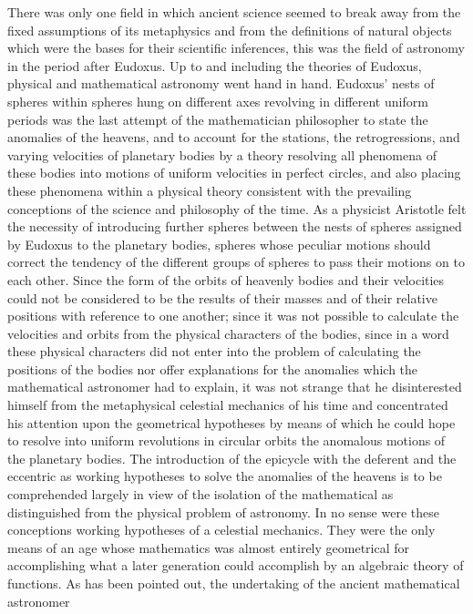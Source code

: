 \documentclass[12pt]{article}
\begin{document}
There was only one field in which ancient science
seemed to break away from the fixed assumptions
of its metaphysics and from the definitions of natural
objects which were the bases for their scientific inferences,
this was the field of astronomy in the period
after Eudoxus. Up to and including the theories of
Eudoxus, physical and mathematical astronomy went
hand in hand. Eudoxus' nests of spheres within spheres
hung on different axes revolving in different uniform
periods was the last attempt of the mathematician
philosopher to state the anomalies of the heavens, and
to account for the stations, the retrogressions, and
varying velocities of planetary bodies by a theory resolving
all phenomena of these bodies into motions of
uniform velocities in perfect circles, and also placing
these phenomena within a physical theory consistent
with the prevailing conceptions of the science and philosophy
of the time. As a physicist Aristotle felt the
necessity of introducing further spheres between the
nests of spheres assigned by Eudoxus to the planetary
bodies, spheres whose peculiar motions should correct
the tendency of the different groups of spheres to pass
their motions on to each other. Since the form of the
orbits of heavenly bodies and their velocities could not
be considered to be the results of their masses and of
their relative positions with reference to one another;
since it was not possible to calculate the velocities and
orbits from the physical characters of the bodies, since
in a word these physical characters did not enter into
the problem of calculating the positions of the bodies
nor offer explanations for the anomalies which the
mathematical astronomer had to explain, it was not
strange that he disinterested himself from the metaphysical
celestial mechanics of his time and concentrated
his attention upon the geometrical hypotheses
by means of which he could hope to resolve into uniform
revolutions in circular orbits the anomalous motions
of the planetary bodies. The introduction of the
epicycle with the deferent and the eccentric as working
hypotheses to solve the anomalies of the heavens is
to be comprehended largely in view of the isolation of
the mathematical as distinguished from the physical
problem of astronomy. In no sense were these conceptions
working hypotheses of a celestial mechanics.
They were the only means of an age whose mathematics
was almost entirely geometrical for accomplishing
what a later generation could accomplish by an algebraic
theory of functions. As has been pointed out,
the undertaking of the ancient mathematical astronomer
\end{document}

